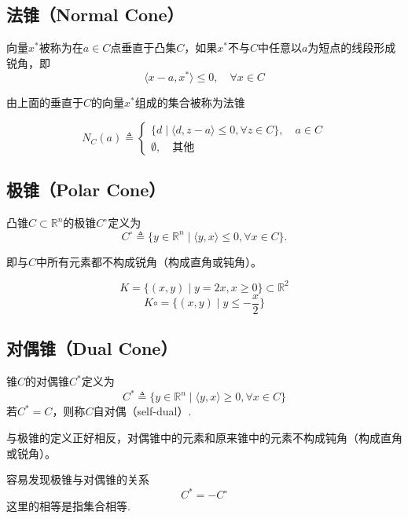 \subsection{法锥（Normal Cone）}
\begin{definition}
	向量$x^*$被称为在$a\in C$点垂直于凸集$C$，如果$x^*$不与$C$中任意以$a$为短点的线段形成锐角，即
	\begin{equation*}
		\langle x-a, x^*\rangle \leq 0,\quad \forall x\in C
	\end{equation*}
\end{definition}
由上面的垂直于$C$的向量$x^*$组成的集合被称为法锥
\begin{definition}
	\begin{equation*}
		N_C(a) \triangleq\begin{cases}
			\{d\mid \langle d, z-a\rangle\leq 0, \forall z \in C\},\quad a\in C\\
			\emptyset,\quad \text{其他}
		\end{cases}
	\end{equation*}
\end{definition}
\subsection{极锥（Polar Cone）}
\begin{definition}
	凸锥$C\subset \mathbb{R}^n$的极锥$C^\circ$定义为
	\begin{equation*}
		C^\circ \triangleq \{y\in \mathbb{R}^n\mid \langle y, x\rangle \leq 0, \forall x\in C\}.
	\end{equation*}
\end{definition}
\begin{note}
	即与$C$中所有元素都不构成锐角（构成直角或钝角）。
\end{note}
\begin{example}
	\begin{equation*}
		K = \{(x, y)\mid y = 2x, x\geq 0\}\subset \mathbb{R}^2
	\end{equation*}
	\begin{equation*}
		K\circ = \{(x, y)\mid y \leq -\frac{x}{2}\}
	\end{equation*}
\end{example}
\subsection{对偶锥（Dual Cone）}
\begin{definition}
	锥$C$的对偶锥$C^*$定义为
	\begin{equation*}
		C^* \triangleq \{y\in\mathbb{R}^n\mid \langle y, x\rangle \geq 0,\forall x\in C\}
	\end{equation*}
	若$C^* = C$，则称$C$自对偶（self-dual）.
\end{definition}
\begin{note}
	与极锥的定义正好相反，对偶锥中的元素和原来锥中的元素不构成钝角（构成直角或锐角）。
\end{note}
\begin{note}
	容易发现极锥与对偶锥的关系
	\begin{equation*}
		C^* = -C^\circ
	\end{equation*}
	这里的相等是指集合相等.
\end{note}
